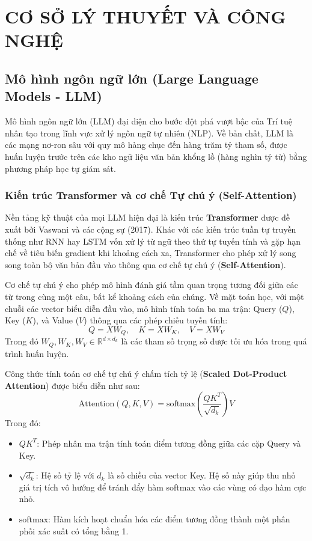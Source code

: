 \chapter{CƠ SỞ LÝ THUYẾT VÀ CÔNG NGHỆ}
\label{ch:chuong2}

\section{Mô hình ngôn ngữ lớn (Large Language Models - LLM)}

Mô hình ngôn ngữ lớn (LLM) đại diện cho bước đột phá vượt bậc của Trí tuệ nhân tạo trong lĩnh vực xử lý ngôn ngữ tự nhiên (NLP). Về bản chất, LLM là các mạng nơ-ron sâu với quy mô hàng chục đến hàng trăm tỷ tham số, được huấn luyện trước trên các kho ngữ liệu văn bản khổng lồ (hàng nghìn tỷ từ) bằng phương pháp học tự giám sát.

\subsection{Kiến trúc Transformer và cơ chế Tự chú ý (Self-Attention)}

Nền tảng kỹ thuật của mọi LLM hiện đại là kiến trúc \textbf{Transformer} được đề xuất bởi Vaswani và các cộng sự (2017). Khác với các kiến trúc tuần tự truyền thống như RNN hay LSTM vốn xử lý từ ngữ theo thứ tự tuyến tính và gặp hạn chế về tiêu biến gradient khi khoảng cách xa, Transformer cho phép xử lý song song toàn bộ văn bản đầu vào thông qua cơ chế tự chú ý (\textbf{Self-Attention}).

Cơ chế tự chú ý cho phép mô hình đánh giá tầm quan trọng tương đối giữa các từ trong cùng một câu, bất kể khoảng cách của chúng. Về mặt toán học, với một chuỗi các vector biểu diễn đầu vào, mô hình tính toán ba ma trận: Query ($Q$), Key ($K$), và Value ($V$) thông qua các phép chiếu tuyến tính:
\begin{equation}
    Q = XW_Q, \quad K = XW_K, \quad V = XW_V
\end{equation}
Trong đó $W_Q, W_K, W_V \in \mathbb{R}^{d \times d_k}$ là các tham số trọng số được tối ưu hóa trong quá trình huấn luyện.

Công thức tính toán cơ chế tự chú ý chấm tích tỷ lệ (\textbf{Scaled Dot-Product Attention}) được biểu diễn như sau:
\begin{equation}
    \text{Attention}(Q, K, V) = \text{softmax}\left(\frac{QK^T}{\sqrt{d_k}}\right)V
\end{equation}
Trong đó:
\begin{itemize}
    \item $QK^T$: Phép nhân ma trận tính toán điểm tương đồng giữa các cặp Query và Key.
    \item $\sqrt{d_k}$: Hệ số tỷ lệ với $d_k$ là số chiều của vector Key. Hệ số này giúp thu nhỏ giá trị tích vô hướng để tránh đẩy hàm softmax vào các vùng có đạo hàm cực nhỏ.
    \item $\text{softmax}$: Hàm kích hoạt chuẩn hóa các điểm tương đồng thành một phân phối xác suất có tổng bằng 1.
\end{itemize}

